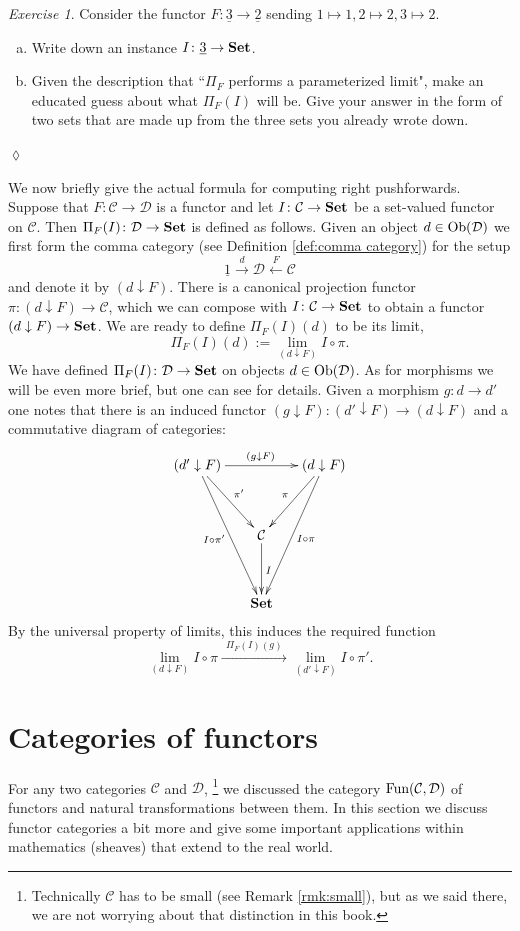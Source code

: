 \documentclass{book}
\def\tn{\textnormal}
\def\mc{\mathcal}
\def\Fun{\tn{Fun}}
\def\Ob{\tn{Ob}}
\def\to{\rightarrow}
\def\down{\downarrrow}
\def\taking{\colon}
\def\down{\downarrow}
\def\ul{\underline}
\newcommand{\To}[1]{\xrightarrow{#1}}
\newcommand{\Too}[1]{\xrightarrow{\ \ #1\ \ }}
\newcommand{\From}[1]{\xleftarrow{#1}}
\def\Set{{\bf Set}}
\def\mcC{\mc{C}}
\def\mcD{\mc{D}}
\theoremstyle{remark}
\newtheorem{exc}[subsubsection]{Exercise}
\newenvironment{exercise}{\begin{exc}}{\hspace*{\fill}$\lozenge$\end{exc}}
\theoremstyle{definition}
\def\sexc{\begin{enumerate}[a.)]\setlength{\itemsep}{.1cm}\setlength{\parskip}{.1cm}\item}
\def\next{\item}
\def\endsexc{\end{enumerate}}
\begin{document}
\begin{exercise}
Consider the functor $F\taking\ul{3}\to\ul{2}$ sending $1\mapsto 1, 2\mapsto 2, 3\mapsto 2$.
\sexc Write down an instance $I\taking\ul{3}\to\Set$.
\next Given the description that ``$\Pi_F$ performs a parameterized limit", make an educated guess about what $\Pi_F(I)$ will be. Give your answer in the form of two sets that are made up from the three sets you already wrote down.
\endsexc
\end{exercise}

We now briefly give the actual formula for computing right pushforwards. Suppose that $F\taking\mcC\to\mcD$ is a functor and let $I\taking\mcC\to\Set$ be a set-valued functor on $\mcC$. Then $\Pi_F(I)\taking\mcD\to\Set$ is defined as follows. Given an object $d\in\Ob(\mcD)$ we first form the comma category (see Definition \ref{def:comma category}) for the setup
$$\ul{1}\To{d}\mcD\From{F}\mcC$$
and denote it by $(d\down F)$. There is a canonical projection functor $\pi\taking(d\down F)\to\mcC$, which we can compose with $I\taking\mcC\to\Set$ to obtain a functor $(d\down F)\to\Set$. We are ready to define $\Pi_F(I)(d)$ to be its limit,
$$\Pi_F(I)(d):=\lim_{(d\down F)}I\circ\pi.$$
We have defined $\Pi_F(I)\taking\mcD\to\Set$ on objects $d\in\Ob(\mcD)$. As for morphisms we will be even more brief, but one can see \cite{Sp1} for details. Given a morphism $g\taking d\to d'$ one notes that there is an induced functor $(g\down F)\taking (d'\down F)\to(d\down F)$ and a commutative diagram of categories:
$$
\xymatrix@=15pt{
(d'\down F)\ar[rr]^{(g\down F)}\ar[ddr]^{\pi'}\ar[ddddr]_{I\circ\pi'}&&(d\down F)\ar[ddl]_{\pi}\ar[ddddl]^{I\circ\pi}\\\\
&\mcC\ar[dd]^I\\\\
&\Set
}
$$
By the universal property of limits, this induces the required function $$\lim_{(d\down F)}I\circ\pi\Too{\Pi_F(I)(g)}\lim_{(d'\down F)}I\circ\pi'.$$


\section{Categories of functors}

For any two categories $\mcC$ and $\mcD$,
\footnote{Technically $\mcC$ has to be small (see Remark \ref{rmk:small}), but as we said there, we are not worrying about that distinction in this book.}
we discussed the category $\Fun(\mcC,\mcD)$ of functors and natural transformations between them. In this section we discuss functor categories a bit more and give some important applications within mathematics (sheaves) that extend to the real world.
\end{document}
